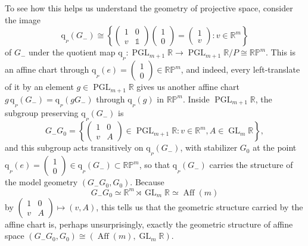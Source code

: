 \documentclass[12pt,a4paper]{amsart}
\theoremstyle{definition}
\DeclareMathOperator{\Aff}{Aff}
\DeclareMathOperator{\GLin}{GL}
\DeclareMathOperator{\PGL}{PGL}
\newcommand{\quot}[1]{\mathrm{q}_{{}_{#1}}}
\begin{document}
To see how this helps us understand the geometry of projective space, consider the image
\[\quot{P}(G_-)\cong \left\{\begin{pmatrix}1 & 0 \\ v & \mathds{1}\end{pmatrix}\begin{pmatrix}1 \\ 0\end{pmatrix}=\begin{pmatrix}1 \\ v\end{pmatrix}:v\in\mathbb{R}^m\right\}\]
of $G_-$ under the quotient map $\quot{P}:\PGL_{m+1}\mathbb{R}\to\PGL_{m+1}\mathbb{R}/P\cong\mathbb{RP}^m$. This is an affine chart through $\quot{P}(e)=(\begin{smallmatrix}1 \\ 0\end{smallmatrix})\in\mathbb{RP}^m$, and indeed, every left-translate of it by an element $g\in\PGL_{m+1}\mathbb{R}$ gives us another affine chart $g\,\quot{P}\!(G_-)=\quot{P}\!(gG_-)$ through $\quot{P}(g)$ in $\mathbb{RP}^m$. Inside $\PGL_{m+1}\mathbb{R}$, the subgroup preserving $\quot{P}(G_-)$ is
\[G_-G_0=\left\{\begin{pmatrix}1 & 0 \\ v & A\end{pmatrix}\in\PGL_{m+1}\mathbb{R}:v\in\mathbb{R}^m,A\in\GLin_m\mathbb{R}\right\},\]
and this subgroup acts transitively on $\quot{P}(G_-)$, with stabilizer $G_0$ at the point $\quot{P}(e)=(\begin{smallmatrix}1 \\ 0\end{smallmatrix})\in \quot{P}(G_-)\subset\mathbb{RP}^m$, so that $\quot{P}(G_-)$ carries the structure of the model geometry $(G_-G_0,G_0)$. Because
\[G_-G_0\simeq\mathbb{R}^m\rtimes\GLin_m\mathbb{R}\simeq\Aff(m)\]
by $(\begin{smallmatrix}1 & 0 \\ v & A\end{smallmatrix})\mapsto(v,A)$, this tells us that the geometric structure carried by the affine chart is, perhaps unsurprisingly, exactly the geometric structure of affine space $(G_-G_0,G_0)\cong(\Aff(m),\GLin_m\mathbb{R})$.
\end{document}
